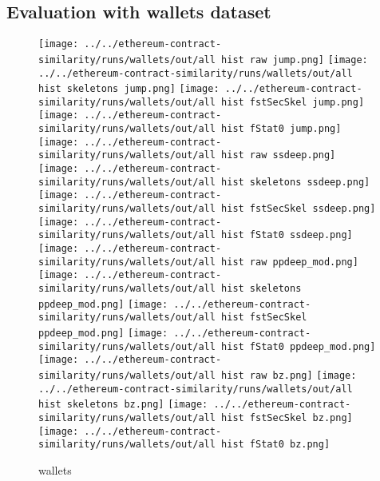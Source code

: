 \documentclass[../main.tex]{subfiles}
\begin{document}
\subsection{Evaluation with wallets dataset}


\begin{figure*}[ht!]
  \centering
  \texttt{[image: ../../ethereum-contract-similarity/runs/wallets/out/all hist raw jump.png]}
  \texttt{[image: ../../ethereum-contract-similarity/runs/wallets/out/all hist skeletons jump.png]}
  \texttt{[image: ../../ethereum-contract-similarity/runs/wallets/out/all hist fstSecSkel jump.png]}
  \texttt{[image: ../../ethereum-contract-similarity/runs/wallets/out/all hist fStat0 jump.png]}\\

  \texttt{[image: ../../ethereum-contract-similarity/runs/wallets/out/all hist raw ssdeep.png]}
  \texttt{[image: ../../ethereum-contract-similarity/runs/wallets/out/all hist skeletons ssdeep.png]}
  \texttt{[image: ../../ethereum-contract-similarity/runs/wallets/out/all hist fstSecSkel ssdeep.png]}
  \texttt{[image: ../../ethereum-contract-similarity/runs/wallets/out/all hist fStat0 ssdeep.png]}\\

  \texttt{[image: ../../ethereum-contract-similarity/runs/wallets/out/all hist raw ppdeep\_mod.png]}
  \texttt{[image: ../../ethereum-contract-similarity/runs/wallets/out/all hist skeletons ppdeep\_mod.png]}
  \texttt{[image: ../../ethereum-contract-similarity/runs/wallets/out/all hist fstSecSkel ppdeep\_mod.png]}
  \texttt{[image: ../../ethereum-contract-similarity/runs/wallets/out/all hist fStat0 ppdeep\_mod.png]}\\

  \texttt{[image: ../../ethereum-contract-similarity/runs/wallets/out/all hist raw bz.png]}
  \texttt{[image: ../../ethereum-contract-similarity/runs/wallets/out/all hist skeletons bz.png]}
  \texttt{[image: ../../ethereum-contract-similarity/runs/wallets/out/all hist fstSecSkel bz.png]}
  \texttt{[image: ../../ethereum-contract-similarity/runs/wallets/out/all hist fStat0 bz.png]}

  \caption{wallets}
  \label{fig:hist_wallets}
\end{figure*}
\end{document}
